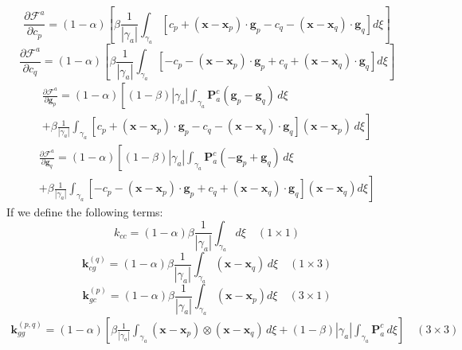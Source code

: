 \documentclass[11pt]{article} %
\begin{document}
\begin{equation}
	\frac{\partial \mathcal{F}^a}{\partial c_p} = (1-\alpha) \left[ \beta \frac{1}{| \gamma_a |} \int_{\gamma_a} \left[ c_p + (\mathbf{x} - \mathbf{x}_p) \cdot \mathbf{g}_p - c_q - (\mathbf{x} - \mathbf{x}_q) \cdot \mathbf{g}_q \right] d \xi \right]
\end{equation}
\begin{equation}
	\frac{\partial \mathcal{F}^a}{\partial c_q} = (1-\alpha) \left[ \beta \frac{1}{| \gamma_a |} \int_{\gamma_a} \left[ -c_p - (\mathbf{x} - \mathbf{x}_p) \cdot \mathbf{g}_p + c_q + (\mathbf{x} - \mathbf{x}_q) \cdot \mathbf{g}_q \right] d \xi \right]
\end{equation}
\begin{eqnarray}
	\frac{\partial \mathcal{F}^a}{\partial \mathbf{g}_p} = (1-\alpha) \left[ (1-\beta) | \gamma_a | \int_{\gamma_a} \mathbf{P}^c_a (\mathbf{g}_p - \mathbf{g}_q ) \, d \xi \right. \nonumber \\ + \left. \beta \frac{1}{| \gamma_a |} \int_{\gamma_a} \left[ c_p + (\mathbf{x} - \mathbf{x}_p) \cdot \mathbf{g}_p - c_q - (\mathbf{x} - \mathbf{x}_q) \cdot \mathbf{g}_q \right] (\mathbf{x} - \mathbf{x}_p) \, d \xi \right]
\end{eqnarray}
\begin{eqnarray}
	\frac{\partial \mathcal{F}^a}{\partial \mathbf{g}_q} = (1-\alpha) \left[ (1-\beta) | \gamma_a | \int_{\gamma_a} \mathbf{P}^c_a (- \mathbf{g}_p + \mathbf{g}_q ) \, d \xi \right. \nonumber \\ + \left. \beta \frac{1}{| \gamma_a |} \int_{\gamma_a} \left[ -c_p - (\mathbf{x} - \mathbf{x}_p) \cdot \mathbf{g}_p + c_q + (\mathbf{x} - \mathbf{x}_q) \cdot \mathbf{g}_q \right] (\mathbf{x} - \mathbf{x}_q) d \xi \right]
\end{eqnarray}
If we define the following terms:
\begin{equation}
	k_{cc} = (1-\alpha) \beta \frac{1}{| \gamma_a |} \int_{\gamma_a} d \xi \quad (1 \times 1)
\end{equation}
\begin{equation}
	\mathbf{k}_{cg}^{(q)} = (1-\alpha) \beta \frac{1}{| \gamma_a |} \int_{\gamma_a} (\mathbf{x} - \mathbf{x}_q) \, d \xi \quad (1 \times 3)
\end{equation}
\begin{equation}
	\mathbf{k}_{gc}^{(p)} = (1-\alpha) \beta \frac{1}{| \gamma_a |} \int_{\gamma_a} (\mathbf{x} - \mathbf{x}_p) d \xi \quad (3 \times 1)
\end{equation}
\begin{eqnarray}
	\mathbf{k}_{gg}^{(p,q)} = (1-\alpha) \left[ \beta \frac{1}{| \gamma_a |} \int_{\gamma_a} (\mathbf{x} - \mathbf{x}_p) \otimes (\mathbf{x} - \mathbf{x}_q) \, d \xi + (1-\beta) | \gamma_a | \int_{\gamma_a} \mathbf{P}^c_a \, d \xi \right] \quad (3 \times 3)
\end{eqnarray}
\end{document}

